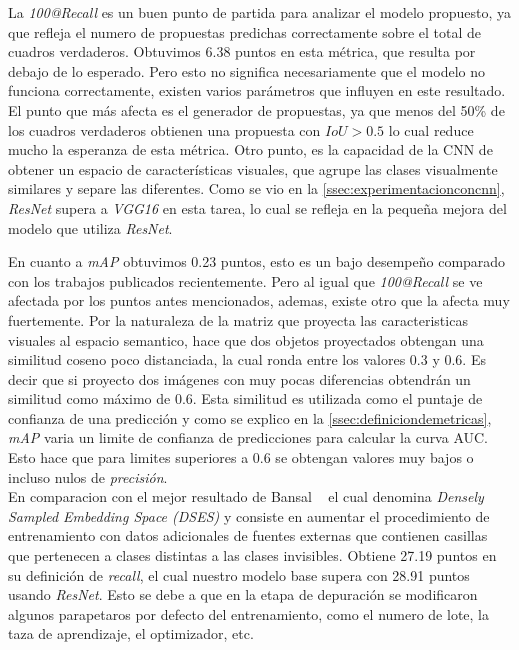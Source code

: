 La \textit{100@Recall} es un buen punto de partida para analizar el modelo propuesto, ya que refleja el numero de propuestas predichas correctamente sobre el total de cuadros verdaderos. Obtuvimos 6.38 puntos en esta métrica, que resulta por debajo de lo esperado. Pero esto no significa necesariamente que el modelo no funciona correctamente, existen varios parámetros que influyen en este resultado. El punto que más afecta es el generador de propuestas, ya que menos del 50\% de los cuadros verdaderos obtienen una propuesta con $IoU > 0.5$ lo cual reduce mucho la esperanza de esta métrica. Otro punto, es la capacidad de la CNN de obtener un espacio de características visuales, que agrupe las clases visualmente similares y separe las diferentes. Como se vio en la \autoref{ssec:experimentacionconcnn}, \textit{ResNet} supera a \textit{VGG16} en esta tarea, lo cual se refleja en la pequeña mejora del modelo que utiliza  \textit{ResNet}.

En cuanto a \textit{mAP} obtuvimos 0.23 puntos, esto es un bajo desempeño comparado con los trabajos publicados recientemente. Pero al igual que \textit{100@Recall} se ve afectada por los puntos antes mencionados, ademas, existe otro que la afecta muy fuertemente. Por la naturaleza de la matriz que proyecta las caracteristicas visuales al espacio semantico, hace que dos objetos proyectados obtengan una similitud coseno poco distanciada, la cual ronda entre los valores 0.3 y 0.6. Es decir que si proyecto dos imágenes con muy pocas diferencias obtendrán un similitud como máximo de 0.6. Esta similitud es utilizada como el puntaje de confianza de una predicción y como se explico en la \autoref{ssec:definiciondemetricas}, \textit{mAP} varia un limite de confianza de predicciones para calcular la curva AUC. Esto hace que para limites superiores a 0.6 se obtengan valores muy bajos o incluso nulos de \textit{precisión}.\\


En comparacion con el mejor resultado de Bansal \etal~\cite{bansal2018zero} el cual denomina \textit{Densely Sampled Embedding Space (DSES)} y consiste en aumentar el procedimiento de entrenamiento con datos adicionales de fuentes externas que contienen casillas que pertenecen a clases distintas a las clases invisibles. Obtiene 27.19 puntos en su definición de \textit{recall}, el cual nuestro modelo base supera con 28.91 puntos usando \textit{ResNet}. Esto se debe a que en la etapa de depuración se modificaron algunos parapetaros por defecto del entrenamiento, como el numero de lote, la taza de aprendizaje, el optimizador, etc.  

